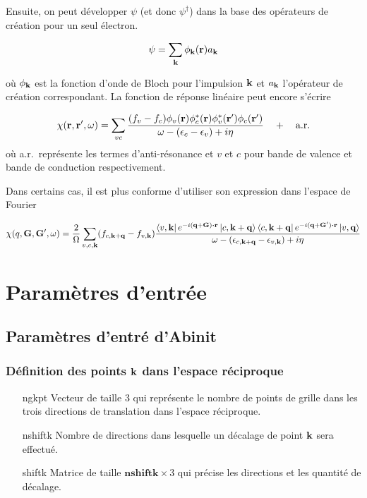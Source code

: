 Ensuite, on peut développer $\psi$ (et donc $\psi^\dagger$)
dans la base des opérateurs de création pour un seul électron.

\begin{equation*}
  \psi = \sum_{\vb{k}} \phi_{\vb{k}}(\vb{r}) a_{\vb{k}}
\end{equation*}

où $\phi_{\vb{k}}$ est la fonction d'onde de Bloch pour l'impulsion $\vb{k}$
et $a_{\vb{k}}$ l'opérateur de création correspondant.
La fonction de réponse linéaire peut encore s'écrire

\begin{equation}\label{eqn-chi}
  \chi(\vb{r}, \vb{r}', \omega) = \sum_{vc} \frac{(f_v - f_c)\phi_v(\vb{r}) \phi_c^*(\vb{r}) \phi_v^*(\vb{r}') \phi_c(\vb{r}')}{\omega - (\epsilon_c - \epsilon_v) + i\eta} \quad + \quad \text{a.r.}
\end{equation}
où a.r.\ représente les termes d'anti-résonance et $v$ et $c$
pour bande de valence et bande de conduction respectivement.

Dans certains cas, il est plus conforme d'utiliser son expression dans l'espace de Fourier

\begin{equation}\label{eqn-chi_q}
  \chi(q, \vb{G}, \vb{G}', \omega) = \frac{2}{\Omega}\sum_{v,c,\vb{k}}(f_{c,\vb{k}+\vb{q}} - f_{v,\vb{k}}) \frac{\bra{v, \vb{k}}e^{-i(\vb{q}+\vb{G})\vdot\vb{r}} \ket{c , \vb{k}+\vb{q}}\bra{c, \vb{k}+\vb{q}} e^{-i(\vb{q}+\vb{G}')\vdot\vb{r}} \ket{v , \vb{q}}}{\omega - (\epsilon_{c, \vb{k}+\vb{q}} - \epsilon_{v,\vb{k}}) + i\eta}
\end{equation}

\chapter{Paramètres d'entrée}
\section{Paramètres d'entré d'Abinit}
\subsection{Définition des points $\vb{k}$ dans l'espace réciproque}
\begin{itemize}[labelwidth=, leftmargin=+, font=\bfseries]
  \item[ngkpt] Vecteur de taille 3 qui représente le nombre de points de grille dans les trois directions de translation dans l'espace réciproque.
  \item[nshiftk] Nombre de directions dans lesquelle un décalage de point $\vb{k}$ sera effectué.
  \item[shiftk] Matrice de taille $\textbf{nshiftk}\times 3$ qui précise les directions et les quantité de décalage.
\end{itemize}

